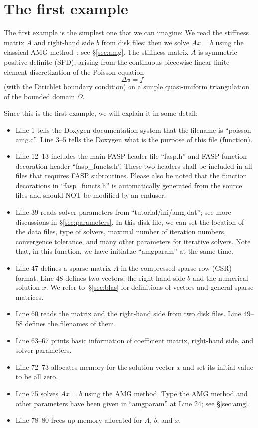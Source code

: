 \documentclass[11pt]{memoir}
\begin{document}
\section{The first example}\label{sec:ex1}

The first example is the simplest one that we can imagine: We read the stiffness matrix $A$ and right-hand side $b$ from disk files; then we solve $Ax=b$ using the classical AMG method~\cite{Brandt.BrandtMcCormick.1982uq,Ruge.RugeStuben.1985ij,Ruge.RugeStuben.1987bs}; see \S\ref{sec:amg}. The stiffness matrix $A$ is symmetric positive definite (SPD), arising from the continuous piecewise linear finite element discretization of the Poisson equation 
$$-\Delta u = f$$ 
(with the Dirichlet boundary condition) on a simple quasi-uniform triangulation of the bounded domain $\Omega$.
%

%
Since this is the first example, we will explain it in some detail:
\begin{itemize}
%
\item Line 1 tells the Doxygen documentation system that the filename is ``poisson-amg.c''. Line 3--5 tells the Doxygen what is the purpose of this file (function). 
%
\item Line 12--13 includes the main FASP header file ``fasp.h'' and FASP function decoration header ``fasp\_functs.h''. These two headers shall be included in all files that requires FASP subroutines. Please also be noted that the function decorations in ``fasp\_functs.h'' is automatically generated from the source files and should NOT be modified by an enduser. 
%
\item Line 39 reads solver parameters from ``tutorial/ini/amg.dat''; see more discussions in \S\ref{sec:parameters}. In this disk file, we can set the location of the data files, type of solvers, maximal number of iteration numbers, convergence tolerance, and many other parameters for iterative solvers. Note that, in this function, we have initialize ``amgparam'' at the same time. 
%
\item Line 47 defines a sparse matrix $A$ in the compressed sparse row (CSR) format. Line 48 defines two vectors: the right-hand side $b$ and the numerical solution $x$. We refer to~\S\ref{sec:blas} for definitions of vectors and general sparse matrices.
%
\item Line 60 reads the matrix and the right-hand side from two disk files. Line 49--58 defines the filenames of them.
%
\item Line 63--67 prints basic information of coefficient matrix, right-hand side, and solver parameters.
%
\item Line 72--73 allocates memory for the solution vector $x$ and set its initial value to be all zero.
%
\item Line 75 solves $Ax=b$ using the AMG method. Type the AMG method and other parameters have been given in ``amgparam'' at Line 24; see \S\ref{sec:amg}.
%
\item Line 78--80 frees up memory allocated for $A$, $b$, and $x$.
\end{itemize}
\end{document}
